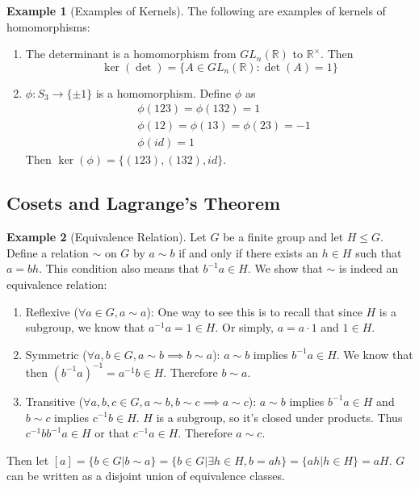 \documentclass[12pt]{article}
\theoremstyle{definition}
\newcommand{\R}{\mathbb{R}}
\newtheorem{example}{\color{WildStrawberry}Example}
\theoremstyle{definition}
\begin{document}
\begin{example}[Examples of Kernels]
The following are examples of kernels of homomorphisms:
\begin{enumerate}
	\item The determinant is a homomorphism from $GL_n(\mathbb{R})$ to $\R^{\times}$. Then
	\begin{equation}
		\ker(\det) = \{ A \in GL_n(\R) : \det(A) = 1 \}
	\end{equation}
	\item $\phi : S_3 \to \{\pm 1\}$ is a homomorphism. Define $\phi$ as 
	\begin{align*}
		&\phi(1 2 3) = \phi(1 3 2) = 1\\
		&\phi(1 2) = \phi(1 3) = \phi(2 3) = -1 \\
		&\phi(id) = 1
	\end{align*}
	Then $\ker(\phi) = \{(1 2 3), (1 3 2), id \}$.
\end{enumerate}
\end{example}

\subsection{Cosets and Lagrange's Theorem}
\begin{example}[Equivalence Relation]
Let $G$ be a finite group and let $H \leq G$. Define a relation $\sim$ on $G$ by $a \sim b$ if and only if there exists an $h \in H$ such that $a = bh$. This condition also means that $b^{-1}a \in H$. We show that $\sim$ is indeed an equivalence relation:
\begin{enumerate}
	\item Reflexive ($\forall a \in G, a \sim a$): One way to see this is to recall that since $H$ is a subgroup, we know that $a^{-1}a = 1 \in H$. Or simply, $a = a \cdot 1$ and $1 \in H$. 
	\item Symmetric ($\forall a,b \in G, a \sim b \implies b \sim a$): $a \sim b$ implies $b^{-1}a \in H$. We know that then $(b^{-1}a)^{-1} = a^{-1}b \in H$. Therefore $b \sim a$. 
	\item Transitive ($\forall a,b,c \in G, a \sim b, b\sim c \implies a \sim c$): $a \sim b$ implies $b^{-1}a \in H$ and $b \sim c$ implies $c^{-1}b \in H$. $H$ is a subgroup, so it's closed under products. Thus $c^{-1}bb^{-1}a \in H$ or that $c^{-1}a \in H$. Therefore $a \sim c$.
\end{enumerate}
Then let $[a] = \{ b \in G | b \sim a \} = \{b \in G | \exists h \in H, b = ah \} = \{ah | h \in H \} = aH$. $G$ can be written as a disjoint union of equivalence classes. 
\end{example}
\end{document}
